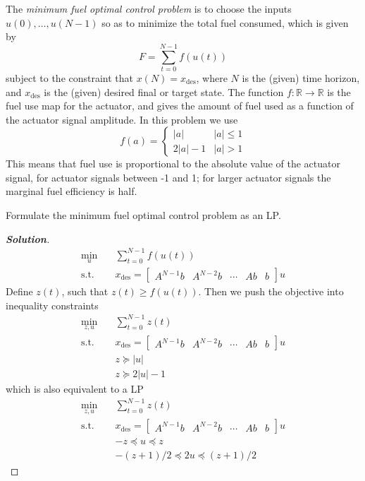 \documentclass[11pt]{article}
\newenvironment{solution}
  {\renewcommand\qedsymbol{$\square$}\begin{proof}[\textbf{Solution}]}
  {\end{proof}}
\newcommand{\RR}{\mathbb{R}}
\begin{document}
The \textit{minimum fuel optimal control problem} is to choose the inputs $u(0), \dots, u(N-1)$ so as to minimize the total fuel consumed, which is given by
\[
F = \sum_{t=0}^{N-1} f(u(t))
\]
subject to the constraint that $x(N) = x_{\text{des}}$, where $N$ is the (given) time horizon, and $x_{\text{des}}$ is the (given) desired final or target state. The function $f:\RR\rightarrow \RR$ is the fuel use map for the actuator, and gives the amount of fuel used as a function of the actuator signal amplitude. In this problem we use
\[
f(a) = 
\begin{cases}
  |a| & |a| \leq 1\\
  2|a| -1 & |a| >1
\end{cases}
\]
This means that fuel use is proportional to the absolute value of the actuator signal, for actuator signals between -1 and 1; for larger actuator signals the marginal fuel efficiency is half.

Formulate the minimum fuel optimal control problem as an LP.

\begin{solution}
  \begin{align*}
    \min_u\quad & \sum_{t=0}^{N-1} f(u(t))\\
    \text{s.t.}\quad & 
    x_{\text{des}} = 
    \begin{bmatrix}
      A^{N-1}b & A^{N-2}b &\cdots & Ab & b
    \end{bmatrix}
    u
  \end{align*}
  Define $z(t)$, such that $z(t) \geq f(u(t))$. Then we push the objective into inequality constraints
  \begin{align*}
    \min_{z, u}\quad & \sum_{t=0}^{N-1} z(t)\\
    \text{s.t.}\quad & 
    x_{\text{des}} = 
    \begin{bmatrix}
      A^{N-1}b & A^{N-2}b &\cdots & Ab & b
    \end{bmatrix}
    u\\
    & z \succeq |u|\\
    & z \succeq 2|u| - 1
  \end{align*}
  which is also equivalent to a LP
  \begin{align*}
    \min_{z, u}\quad & \sum_{t=0}^{N-1} z(t)\\
    \text{s.t.}\quad & 
    x_{\text{des}} = 
    \begin{bmatrix}
      A^{N-1}b & A^{N-2}b &\cdots & Ab & b
    \end{bmatrix}
    u\\
    & -z \preceq u \preceq z\\
    & -(z + 1)/2 \preceq 2u \preceq (z + 1)/2
  \end{align*}
\end{solution}
\end{document}
